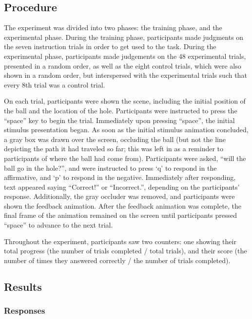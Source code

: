 \documentclass[10pt,letterpaper]{article}
\begin{document}
\subsection{Procedure}

The experiment was divided into two phases: the training phase, and the experimental phase. During the training phase, participants made judgments on the seven instruction trials in order to get used to the task. During the experimental phase, participants made judgements on the 48 experimental trials, presented in a random order, as well as the eight control trials, which were also shown in a random order, but interspersed with the experimental trials such that every 8th trial was a control trial.

On each trial, participants were shown the scene, including the initial position of the ball and the location of the hole. Participants were instructed to press the ``space'' key to begin the trial. Immediately upon pressing ``space'', the initial stimulus presentation began. As soon as the initial stimulus animation concluded, a gray box was drawn over the screen, occluding the ball (but not the line depicting the path it had traveled so far; this was left in as a reminder to participants of where the ball had come from). Participants were asked, ``will the ball go in the hole?'', and were instructed to press `q' to respond in the affirmative, and `p' to respond in the negative. Immediately after responding, text appeared saying ``Correct!'' or ``Incorrect.'', depending on the participants' response. Additionally, the gray occluder was removed, and participants were shown the feedback animation. After the feedback animation was complete, the final frame of the animation remained on the screen until participants pressed ``space'' to advance to the next trial. 

Throughout the experiment, participants saw two counters: one showing their total progress (the number of trials completed / total trials), and their score (the number of times they answered correctly / the number of trials completed).

\subsection{Results}

\subsubsection{Responses}
\end{document}

